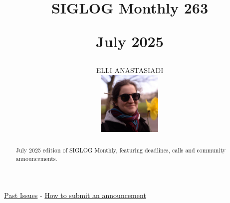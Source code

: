 \documentclass[prodmode,acmtecs]{acmsmall} %
\newcounter{colstart}
\begin{document}
\setcounter{colstart}{\thepage}

\title{{\huge\sc SIGLOG Monthly 263}

 July 2025}\author{ELLI ANASTASIADI\vspace*{-2.6cm}\begin{flushright}\includegraphics[width=30mm]{elli_anastasiadi.png}\end{flushright}}\begin{abstract}July 2025 edition of SIGLOG Monthly, featuring deadlines, calls and community announcements.
\end{abstract}


\maketitlee

\href{https://lics.siglog.org/newsletters/}{Past Issues}
 - 
\href{https://lics.siglog.org/newsletters/inst.html}{How to submit an announcement}
\end{document}
